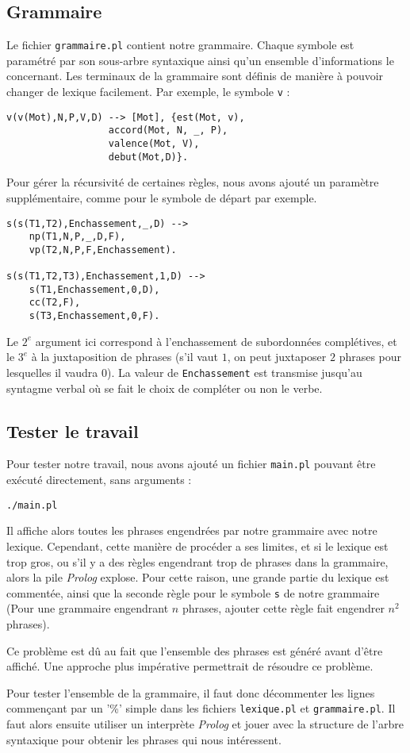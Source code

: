 \documentclass[a4paper,10pt]{article}
\newcommand\Terme\textit
\begin{document}
\subsection{Grammaire}
Le fichier \texttt{grammaire.pl} contient notre grammaire. Chaque symbole est paramétré par son sous-arbre syntaxique ainsi qu'un ensemble d'informations le concernant. Les terminaux de la grammaire sont définis de manière à pouvoir changer de lexique facilement. Par exemple, le symbole \texttt{v} :
\begin{verbatim}
v(v(Mot),N,P,V,D) --> [Mot], {est(Mot, v),
			      accord(Mot, N, _, P),
			      valence(Mot, V),
			      debut(Mot,D)}.
\end{verbatim}

Pour gérer la récursivité de certaines règles, nous avons ajouté un paramètre supplémentaire, comme pour le symbole de départ par exemple.
\begin{verbatim}
s(s(T1,T2),Enchassement,_,D) --> 
    np(T1,N,P,_,D,F), 
    vp(T2,N,P,F,Enchassement).

s(s(T1,T2,T3),Enchassement,1,D) --> 
    s(T1,Enchassement,0,D), 
    cc(T2,F), 
    s(T3,Enchassement,0,F).
\end{verbatim}

Le $2^e$ argument ici correspond à l'enchassement de subordonnées complétives, et le $3^e$ à la juxtaposition de phrases (s'il vaut $1$, on peut juxtaposer $2$ phrases pour lesquelles il vaudra $0$). La valeur de \texttt{Enchassement} est transmise jusqu'au syntagme verbal où se fait le choix de compléter ou non le verbe.

\subsection{Tester le travail}
Pour tester notre travail, nous avons ajouté un fichier \texttt{main.pl} pouvant être exécuté directement, sans arguments :
\begin{verbatim}
./main.pl
\end{verbatim}
Il affiche alors toutes les phrases engendrées par notre grammaire avec notre lexique. Cependant, cette manière de procéder a ses limites, et si le lexique est trop gros, ou s'il y a des règles engendrant trop de phrases dans la grammaire, alors la pile \Terme{Prolog} explose. Pour cette raison, une grande partie du lexique est commentée, ainsi que la seconde règle pour le symbole \texttt{s} de notre grammaire (Pour une grammaire engendrant $n$ phrases, ajouter cette règle fait engendrer $n^2$ phrases).

Ce problème est dû au fait que l'ensemble des phrases est généré avant d'être affiché. Une approche plus impérative permettrait de résoudre ce problème.

Pour tester l'ensemble de la grammaire, il faut donc décommenter les lignes commençant par un '\%' simple dans les fichiers \texttt{lexique.pl} et \texttt{grammaire.pl}. Il faut alors ensuite utiliser un interprète \Terme{Prolog} et jouer avec la structure de l'arbre syntaxique pour obtenir les phrases qui nous intéressent.
\end{document}
